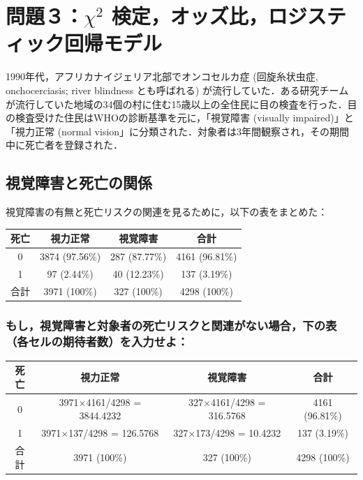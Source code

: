 \documentclass[11pt,]{problemset}
\begin{document}
\hypertarget{chi2-}{%
\section{\texorpdfstring{問題３：\(\chi^2\)
検定，オッズ比，ロジスティック回帰モデル}{問題３：\textbackslash{}chi\^{}2 検定，オッズ比，ロジスティック回帰モデル}}\label{chi2-}}

1990年代，アフリカナイジェリア北部でオンコセルカ症 (回旋糸状虫症,
onchocerciasis; river blindness とも呼ばれる)
が流行していた．ある研究チームが流行していた地域の34個の村に住む15歳以上の全住民に目の検査を行った．目の検査受けた住民はWHOの診断基準を元に，「視覚障害
(visually impaired)」と「視力正常 (normal
vision」に分類された．対象者は3年間観察され，その期間中に死亡者を登録された．

\subsection{視覚障害と死亡の関係}

視覚障害の有無と死亡リスクの関連を見るために，以下の表をまとめた：

\begin{center}
\begin{tabular}{|c|c|c|c|}
\hline
死亡 & 視力正常           & 視覚障害          & 合計             \\ \hline
0  & 3874 (97.56\%) & 287 (87.77\%) & 4161 (96.81\%) \\ \hline
1  & 97 (2.44\%)    & 40 (12.23\%)  & 137 (3.19\%)   \\ \hline
合計 & 3971 (100\%)   & 327 (100\%)   & 4298 (100\%)   \\ \hline
\end{tabular}
\end{center}

\subsubsection{もし，視覚障害と対象者の死亡リスクと関連がない場合，下の表（各セルの期待者数）を入力せよ：}

\begin{center}
\begin{tabular}{|c|c|c|c|}
\hline
死亡 & 視力正常                     & 視覚障害                   & 合計             \\ \hline
0  & 3971$\times$4161/4298 = 3844.4232 & 327$\times$4161/4298 = 316.5768 & 4161 (96.81\%) \\ \hline
1  & 3971$\times$137/4298 = 126.5768   & 327$\times$173/4298 = 10.4232   & 137 (3.19\%)   \\ \hline
合計 & 3971 (100\%)             & 327 (100\%)            & 4298 (100\%)   \\ \hline
\end{tabular}
\end{center}
\end{document}
